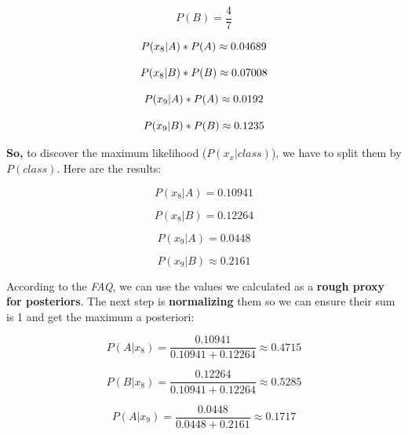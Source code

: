 \documentclass[12pt]{article}
\begin{document}
\begin{enumerate}[leftmargin=\labelsep]
\begin{enumerate}
          \begin{equation*}
            P(B) = \frac{4}{7}
          \end{equation*}

          \[
            P(x_8|A)*P(A) \approx 0.04689 \\
          \]

          \[
            P(x_8|B)*P(B) \approx 0.07008 \\
          \]

          \[
            P(x_9|A)*P(A) \approx 0.0192 \\
          \]

          \[
            P(x_9|B)*P(B) \approx 0.1235 \\
          \]

          \textbf{So,} to discover the maximum likelihood ($P(x_x|class)$), we have to split them by $P(class)$. Here are the results:

          \begin{equation*}
            P(x_8|A) = 0.10941
          \end{equation*}

          \begin{equation*}
            P(x_8|B) = 0.12264
          \end{equation*}

          \begin{equation*}
            P(x_9|A) = 0.0448
          \end{equation*}

          \begin{equation*}
            P(x_9|B) \approx 0.2161
          \end{equation*}
        
          According to the \textit{FAQ}, we can use the values we calculated as a \textbf{rough proxy for posteriors}. 
          The next step is \textbf{normalizing} them so we can ensure their sum is 1 and get the maximum a posteriori:

          \begin{equation*}
            P(A|x_8) = \frac{0.10941}{0.10941+0.12264} \approx 0.4715
          \end{equation*}

          \begin{equation*}
            P(B|x_8) = \frac{0.12264}{0.10941+0.12264} \approx 0.5285
          \end{equation*}

          \begin{equation*}
            P(A|x_9) = \frac{0.0448}{0.0448+0.2161} \approx 0.1717
          \end{equation*}


\end{enumerate}
\end{enumerate}
\end{document}
